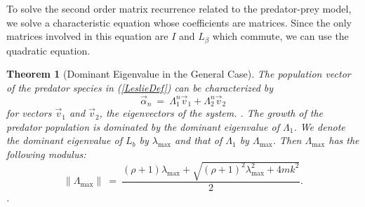 \documentclass[11pt,reqno]{amsart}
\numberwithin{equation}{section}
\theoremstyle{plain}
\newtheorem{theorem}[thm]{Theorem}
\begin{document}
To solve the second order matrix recurrence related to the predator-prey model, we solve a characteristic equation whose coefficients are matrices. Since the only matrices involved in this equation are $I$ and $L_\beta$ which commute, we can use the quadratic equation. 


\begin{theorem}[Dominant Eigenvalue in the General Case]\label{eqn:MaxEvalGen}
    The population vector of the predator species in (\ref{LeslieDef}) can be characterized by 
    \begin{equation}
    \vec \alpha_n \ =\ \Lambda_1^{n}  \vec v_1+ \Lambda_2^{n}\vec v_2
    \end{equation}
    for vectors $\vec v_1$ and $\vec v_2$, the eigenvectors of the system.
    . The 
    growth of the predator population 
    is dominated by the dominant eigenvalue 
    of $\Lambda_1$. We denote the dominant eigenvalue of $L_b$ by $\lambda_{\max}$ and that of $\Lambda_1$ by $\Lambda_{\max}$. Then $\Lambda_{\max}$ has the following modulus:
    \begin{equation}
        \|\Lambda_{\max} \| \ =\   \frac {
            (\rho + 1)\lambda_{\max} + \sqrt{(\rho + 1)^2 \lambda_{\max}^2 + 4mk^2}
        }{2}.
    \end{equation}. 
\end{theorem}
\end{document}

